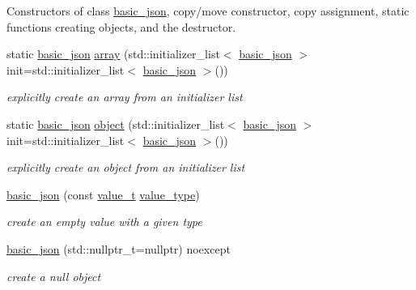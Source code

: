 Constructors of class \mbox{\hyperlink{classnlohmann_1_1basic__json}{basic\+\_\+json}}, copy/move constructor, copy assignment, static functions creating objects, and the destructor. \begin{DoxyCompactItemize}
\item 
static \mbox{\hyperlink{classnlohmann_1_1basic__json}{basic\+\_\+json}} \mbox{\hyperlink{classnlohmann_1_1basic__json_a4a4ec75e4d2845d9bcf7a9e5458e4949}{array}} (std\+::initializer\+\_\+list$<$ \mbox{\hyperlink{classnlohmann_1_1basic__json}{basic\+\_\+json}} $>$ init=std\+::initializer\+\_\+list$<$ \mbox{\hyperlink{classnlohmann_1_1basic__json}{basic\+\_\+json}} $>$())
\begin{DoxyCompactList}\small\item\em explicitly create an array from an initializer list \end{DoxyCompactList}\item 
static \mbox{\hyperlink{classnlohmann_1_1basic__json}{basic\+\_\+json}} \mbox{\hyperlink{classnlohmann_1_1basic__json_a9f42ee7d10eee2d5a73fd94ca7f767ca}{object}} (std\+::initializer\+\_\+list$<$ \mbox{\hyperlink{classnlohmann_1_1basic__json}{basic\+\_\+json}} $>$ init=std\+::initializer\+\_\+list$<$ \mbox{\hyperlink{classnlohmann_1_1basic__json}{basic\+\_\+json}} $>$())
\begin{DoxyCompactList}\small\item\em explicitly create an object from an initializer list \end{DoxyCompactList}\item 
\mbox{\hyperlink{classnlohmann_1_1basic__json_a32124a16dc80729d964d9caf607c2bc8}{basic\+\_\+json}} (const \mbox{\hyperlink{namespacenlohmann_1_1detail_a90aa5ef615aa8305e9ea20d8a947980f}{value\+\_\+t}} \mbox{\hyperlink{classnlohmann_1_1basic__json_a2b3297873b70c080837e8eedc4fec32f}{value\+\_\+type}})
\begin{DoxyCompactList}\small\item\em create an empty value with a given type \end{DoxyCompactList}\item 
\mbox{\hyperlink{classnlohmann_1_1basic__json_ae9be9e956bfc4658f35d17c6aa72b063}{basic\+\_\+json}} (std\+::nullptr\+\_\+t=nullptr) noexcept
\begin{DoxyCompactList}\small\item\em create a null object \end{DoxyCompactList}\item 

\end{DoxyCompactItemize}
